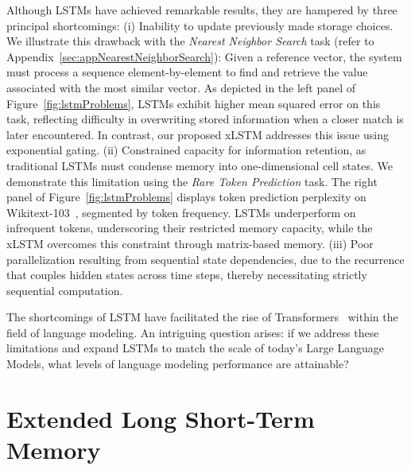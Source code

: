 Although LSTMs have achieved remarkable results, they are hampered by three principal shortcomings: (i) Inability to update previously made storage choices. We illustrate this drawback with the {\it Nearest Neighbor Search} task (refer to Appendix~\ref{sec:appNearestNeighborSearch}): Given a reference vector, the system must process a sequence element-by-element to find and retrieve the value associated with the most similar vector. As depicted in the left panel of Figure~\ref{fig:lstmProblems}, LSTMs exhibit higher mean squared error on this task, reflecting difficulty in overwriting stored information when a closer match is later encountered. In contrast, our proposed xLSTM addresses this issue using exponential gating. (ii) Constrained capacity for information retention, as traditional LSTMs must condense memory into one-dimensional cell states. We demonstrate this limitation using the {\it Rare Token Prediction} task. The right panel of Figure~\ref{fig:lstmProblems} displays token prediction perplexity on Wikitext-103~\citep{Merity:17}, segmented by token frequency. LSTMs underperform on infrequent tokens, underscoring their restricted memory capacity, while the xLSTM overcomes this constraint through matrix-based memory. (iii) Poor parallelization resulting from sequential state dependencies, due to the recurrence that couples hidden states across time steps, thereby necessitating strictly sequential computation.

The shortcomings of LSTM have facilitated the rise of Transformers~\citep{Vaswani:17} within the field of language modeling. An intriguing question arises: if we address these limitations and expand LSTMs to match the scale of today's Large Language Models, what levels of language modeling performance are attainable?

\section{Extended Long Short-Term Memory}
\label{sec:xLSTM}

